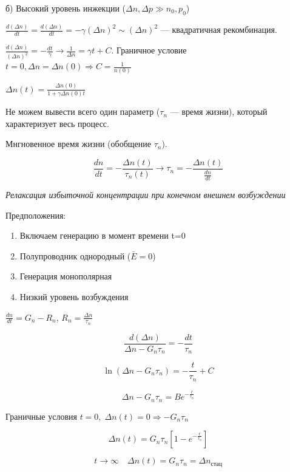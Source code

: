 б) Высокий уровень инжекции ($\Delta n, \Delta p \gg n_0, p_0$)

$\frac{d(\Delta n)}{d t}=\frac{d(\Delta n)}{d t}=-\gamma(\Delta n)^2 \sim(\Delta n)^2$ --- квадратичная рекомбинация.

$\frac{d(\Delta n)}{(\Delta n)^2}=-\frac{d t}{\gamma} \rightarrow \frac{1}{\Delta n}=\gamma t+C$. Граничное условие $t=0, \Delta n=\Delta n(0) \Rightarrow C=\frac{1}{n(0)}$

$\Delta n(t)=\frac{\Delta n(0)}{1+\gamma \Delta n(0) t}$

Не можем вывести всего один параметр ($\tau_n$ --- время жизни), который характеризует весь процесс.

Мнгновенное время жизни (обобщение $\tau_n$).

$$
\frac{d n}{d t}=-\frac{\Delta n(t)}{\tau_n(t)} \rightarrow \tau_n=-\frac{\Delta n(t)}{\frac{d n}{d t}}
$$


\begin{figure}[h!]
    \centering
\end{figure}

\textit{Релаксация избыточной концентрации при конечном внешнем возбуждении}

Предположения:

\begin{enumerate}
    \item Включаем генерацию в момент времени t=0
    \item Полупроводник однородный ($\bar{E}=0$)
    \item Генерация монополярная
    \item Низкий уровень возбуждения
\end{enumerate}

$\frac{d n}{d t}=G_n-R_n$,  $R_n=\frac{\Delta n}{\tau _n}$

$$\frac{d(\Delta n)}{\Delta n-G_n \tau_n}=-\frac{d t}{\tau_n}$$

$$\ln \left(\Delta n-G_n \tau_n\right)=-\frac{t}{\tau_n}+C$$

$$\Delta n-G_n \tau_n=B e^{-\frac{t}{\tau_n}}$$

Граничные условия $t=0, \; \Delta n(t)=0 \Rightarrow -G_n\tau_n$

$$\Delta n(t)=G_n \tau_n\left[1-e^{-\frac{t}{\tau_n}}\right]$$

$$t \rightarrow \infty \quad \Delta n(t)=G_n \tau_n=\Delta n_\text{стац}$$

